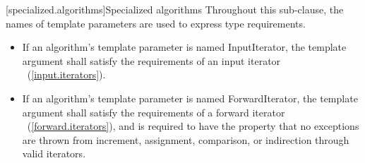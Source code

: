 \setcounter{subsection}{9}
[specialized.algorithms]{Specialized algorithms}
\setcounter{Paras}{0}
\pnum
Throughout this sub-clause, the names of template parameters are used to express type requirements.
{\color{remclr}
\begin{itemize}
\item If an algorithm's template parameter is named InputIterator, the template argument shall satisfy the
requirements of an input iterator ~(\ref{input.iterators}).

\item If an algorithm's template parameter is named ForwardIterator, the template argument shall satisfy the
requirements of a forward iterator ~(\ref{forward.iterators}), and is required to have the property that no exceptions
are thrown from increment, assignment, comparison, or indirection through valid iterators.
\end{itemize}
} %

